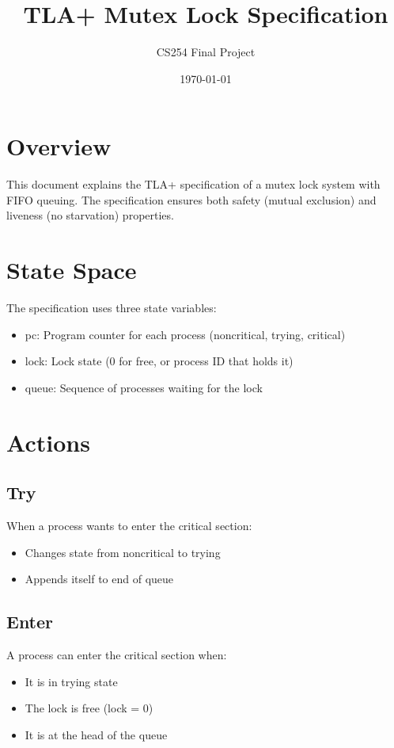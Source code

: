 \documentclass{article}
\title{TLA+ Mutex Lock Specification}
\author{CS254 Final Project}
\date{\today}
\begin{document}
\maketitle

\section{Overview}
This document explains the TLA+ specification of a mutex lock system with FIFO queuing. The specification ensures both safety (mutual exclusion) and liveness (no starvation) properties.

\section{State Space}
The specification uses three state variables:
\begin{itemize}
    \item pc: Program counter for each process (noncritical, trying, critical)
    \item lock: Lock state (0 for free, or process ID that holds it)
    \item queue: Sequence of processes waiting for the lock
\end{itemize}

\section{Actions}
\subsection{Try}
When a process wants to enter the critical section:
\begin{itemize}
    \item Changes state from noncritical to trying
    \item Appends itself to end of queue
\end{itemize}

\subsection{Enter}
A process can enter the critical section when:
\begin{itemize}
    \item It is in trying state
    \item The lock is free (lock = 0)
    \item It is at the head of the queue
\end{itemize}
\end{document}
